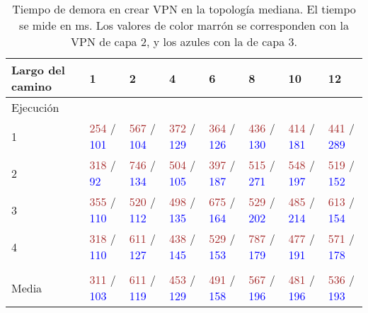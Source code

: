 \begin{table}[!h]
	\scriptsize
	\caption{Tiempo de demora en crear VPN en la topología mediana. El tiempo se mide en ms. Los valores de color marrón se corresponden con la VPN de capa 2, y los azules con la de capa 3.}
	\centering 
	\begin{tabular}{p{2.4cm} p{1.3cm} p{1.3cm} p{1.3cm} p{1.3cm} p{1.3cm} p{1.3cm} p{1.3cm}}
		\hline
		Largo del camino & 1 & 2 & 4 & 6 & 8 & 10 & 12 \\ [0.5ex]
		\hline
		Ejecución & & & & & & & \\
		1 & \textcolor{brown}{254} / \textcolor{blue}{101} & \textcolor{brown}{567} / \textcolor{blue}{104} & \textcolor{brown}{372} / \textcolor{blue}{129} & \textcolor{brown}{364} / \textcolor{blue}{126} & \textcolor{brown}{436} / \textcolor{blue}{130} & \textcolor{brown}{414} / \textcolor{blue}{181} & \textcolor{brown}{441} / \textcolor{blue}{289} \\
		2 & \textcolor{brown}{318} / \textcolor{blue}{92} & \textcolor{brown}{746} / \textcolor{blue}{134} & \textcolor{brown}{504} / \textcolor{blue}{105} & \textcolor{brown}{397} / \textcolor{blue}{187}  & \textcolor{brown}{515} / \textcolor{blue}{271} & \textcolor{brown}{548} / \textcolor{blue}{197} & \textcolor{brown}{519} / \textcolor{blue}{152} \\
		3 & \textcolor{brown}{355} / \textcolor{blue}{110} & \textcolor{brown}{520} / \textcolor{blue}{112} & \textcolor{brown}{498} / \textcolor{blue}{135} & \textcolor{brown}{675} / \textcolor{blue}{164} & \textcolor{brown}{529} / \textcolor{blue}{202} & \textcolor{brown}{485} / \textcolor{blue}{214} & \textcolor{brown}{613} / \textcolor{blue}{154} \\
		4 & \textcolor{brown}{318} / \textcolor{blue}{110} & \textcolor{brown}{611} / \textcolor{blue}{127} & \textcolor{brown}{438} / \textcolor{blue}{145} & \textcolor{brown}{529} / \textcolor{blue}{153} & \textcolor{brown}{787} / \textcolor{blue}{179} & \textcolor{brown}{477} / \textcolor{blue}{191} & \textcolor{brown}{571} / \textcolor{blue}{178} \\
		& & & & & & & \\
		Media & \textcolor{brown}{311} / \textcolor{blue}{103} & \textcolor{brown}{611} / \textcolor{blue}{119} & \textcolor{brown}{453} / \textcolor{blue}{129} & \textcolor{brown}{491} / \textcolor{blue}{158} & \textcolor{brown}{567} / \textcolor{blue}{196} & \textcolor{brown}{481} / \textcolor{blue}{196} & \textcolor{brown}{536} / \textcolor{blue}{193} \\

\end{tabular}
\end{table}
